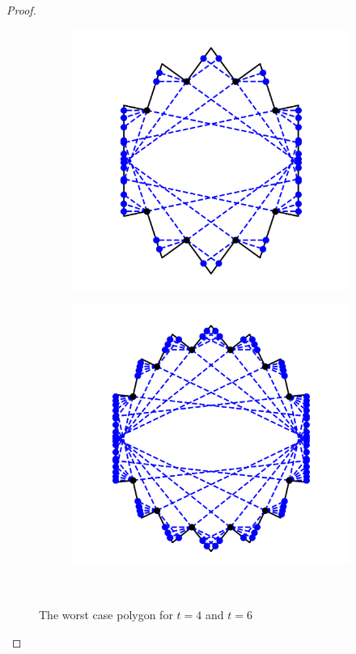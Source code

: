 \documentclass[]{article}  %
\begin{document}
\begin{proof}
\begin{figure}
\centering
\begin{subfigure}{0.5\textwidth}
\centering
\includegraphics[width=\linewidth]{figures/chestnut_5.png}
\label{fig:t4}
\end{subfigure}%
\begin{subfigure}{0.5\textwidth}
\centering
\includegraphics[width=\linewidth]{figures/chestnut_7.png}
\label{fig:t6}
\end{subfigure}\\
\caption{The worst case polygon for $t = 4$ and $t = 6$ 
\label{fig:chestnut}}
\end{figure}


\end{proof}
\end{document}
